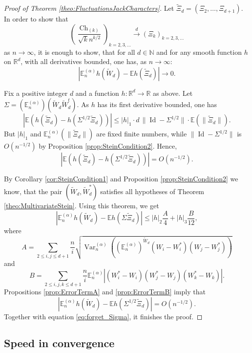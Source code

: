 \documentclass[11pt]{amsart}
\theoremstyle{plain}
\theoremstyle{remark}
\newcommand{\RR}{\mathbb{R}}
\newcommand{\N}{\mathbb{N}}
\newcommand{\esper}{\mathbb{E}}
\DeclareMathOperator{\Var}{Var}
\DeclareMathOperator{\Id}{Id}
\DeclareMathOperator{\Ch}{Ch}
\begin{document}
\begin{proof}[Proof of Theorem \ref{theo:FluctuationsJackCharacters}]
    Let $\tilde{\Xi}_d = (\Xi_2,\dots,\Xi_{d+1})$. In order to show that
    \[ \left( \frac{\Ch_{(k)}}{ \sqrt{k} n^{k/2}} \right)_{k=2,3,\dots} \xrightarrow{d} \left( \Xi_k \right)_{k=2,3,\dots} \]
as $n \to \infty$, it is enough to show, that for all $d \in \N$ and for any smooth function $h$ on $\RR^d$, with all derivatives bounded, one has, as $n \to \infty$:
\[ \left| \esper_n^{(\alpha)}h(\tilde{W}_d) - \esper h(\tilde{\Xi}_d) \right| \to 0.\]

Fix a positive integer $d$ and a function $h:\RR^d \to \RR$ as above.
Let $\varSigma = (\esper_n^{(\alpha)})(\tilde{W}_d\tilde{W}_d^t)$.
As $h$ has its first derivative bounded, one has
\[\left| \esper \left( h(\tilde{\Xi}_d) - 
h(\varSigma^{1/2}\tilde{\Xi}_d) \right) \right| \le
|h|_1 \cdot d\, \lVert \Id - \varSigma^{1/2} \rVert \cdot \esper (\lVert \tilde{\Xi}_d \rVert).\]
But $|h|_1$ and $\esper_n^{(\alpha)}(\lVert \tilde{\Xi}_d \rVert)$ are fixed
finite numbers, while $\lVert \Id - \varSigma^{1/2} \rVert$ is $O(n^{-1/2})$
by Proposition \ref{prop:SteinCondition2}.
Hence,
\begin{equation}
    \left| \esper \left( h(\tilde{\Xi}_d) - 
    h(\varSigma^{1/2}\tilde{\Xi}_d) \right) \right| = O(n^{-1/2}).
    \label{eq:forget_Sigma}
\end{equation}

By Corollary \ref{cor:SteinCondition1} and Proposition \ref{prop:SteinCondition2} we know, that the pair $(\tilde{W}_d, \tilde{W}_d^*)$ satisfies all hypotheses of Theorem \ref{theo:MultivariateStein}.
Using this theorem, we get
\[ \left| \esper_n^{(\alpha)}h(\tilde{W}_d) - \esper h(\varSigma \tilde{\Xi}_d)\right| \leq |h|_2\frac{A}{4} + |h|_3\frac{B}{12},\]
where
\[ A = \sum_{2 \leq i,j \leq d+1} \frac{n}{i} \sqrt{\Var_n^{(\alpha)}\left((\esper_n^{(\alpha)})^{\tilde{W}_d}(W_i - W_i^*)(W_j - W_j^*)\right)}\]
and
\[ B = \sum_{2 \leq i,j,k \leq d+1} \frac{n}{i} \esper_n^{(\alpha)} |(W_i^* - W_i)(W_j^* - W_j)(W_k^* - W_k)|.\] 
Propositions \ref{prop:ErrorTermA} and \ref{prop:ErrorTermB} imply that
\[ \left| \esper_n^{(\alpha)}h(\tilde{W}_d) - \esper h(\varSigma^{1/2} \tilde{\Xi}_d)\right| = O(n^{-1/2}).\]
Together with equation \eqref{eq:forget_Sigma},
it finishes the proof.
\end{proof}

\subsection{Speed in convergence}
\end{document}
